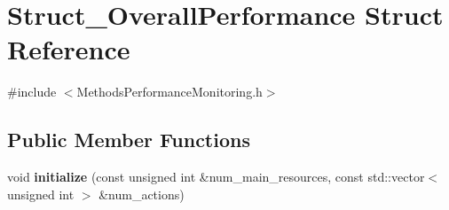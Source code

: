 \hypertarget{structStruct__OverallPerformance}{\section{Struct\-\_\-\-Overall\-Performance Struct Reference}
\label{structStruct__OverallPerformance}
}


{\ttfamily \#include $<$Methods\-Performance\-Monitoring.\-h$>$}

\subsection*{Public Member Functions}
\begin{DoxyCompactItemize}
\item 
\hypertarget{structStruct__OverallPerformance_a0c0008feee04c905191d898c6424e6de}{void {\bfseries initialize} (const unsigned int \&num\-\_\-main\-\_\-resources, const std\-::vector$<$ unsigned int $>$ \&num\-\_\-actions)}\label{structStruct__OverallPerformance_a0c0008feee04c905191d898c6424e6de}


\end{DoxyCompactItemize}
